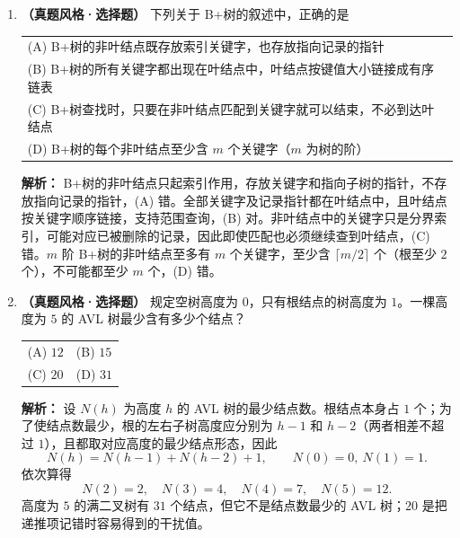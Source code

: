 \begin{enumerate}[resume]

\item \textbf{（真题风格·选择题）} 下列关于 B+树的叙述中，正确的是
\begin{center}
\begin{tabular}{l}
(A) B+树的非叶结点既存放索引关键字，也存放指向记录的指针 \\[4pt]
(B) B+树的所有关键字都出现在叶结点中，叶结点按键值大小链接成有序链表 \\[4pt]
(C) B+树查找时，只要在非叶结点匹配到关键字就可以结束，不必到达叶结点 \\[4pt]
(D) B+树的每个非叶结点至少含 $m$ 个关键字（$m$ 为树的阶）
\end{tabular}
\end{center}

\ifshowsolutions\par\noindent\textbf{解析：} B+树的非叶结点只起索引作用，存放关键字和指向子树的指针，不存放指向记录的指针，(A) 错。全部关键字及记录指针都在叶结点中，且叶结点按关键字顺序链接，支持范围查询，(B) 对。非叶结点中的关键字只是分界索引，可能对应已被删除的记录，因此即使匹配也必须继续查到叶结点，(C) 错。$m$ 阶 B+树的非叶结点至多有 $m$ 个关键字，至少含 $\lceil m/2\rceil$ 个（根至少 $2$ 个），不可能都至少 $m$ 个，(D) 错。
\par\noindent{}\else \answerarea \fi

\vspace{6pt}

\item \textbf{（真题风格·选择题）} 规定空树高度为 $0$，只有根结点的树高度为 $1$。一棵高度为 $5$ 的 AVL 树最少含有多少个结点？
\begin{center}
\begin{tabular}{ll}
(A) $12$ & (B) $15$ \\[6pt]
(C) $20$ & (D) $31$
\end{tabular}
\end{center}

\ifshowsolutions\par\noindent\textbf{解析：} 设 $N(h)$ 为高度 $h$ 的 AVL 树的最少结点数。根结点本身占 $1$ 个；为了使结点数最少，根的左右子树高度应分别为 $h-1$ 和 $h-2$（两者相差不超过 $1$），且都取对应高度的最少结点形态，因此
\[
N(h)=N(h-1)+N(h-2)+1,\qquad N(0)=0,\ N(1)=1.
\]
依次算得
\[
N(2)=2,\quad N(3)=4,\quad N(4)=7,\quad N(5)=12.
\]
高度为 $5$ 的满二叉树有 $31$ 个结点，但它不是结点数最少的 AVL 树；$20$ 是把递推项记错时容易得到的干扰值。
\par\noindent{}\else \answerarea \fi


\end{enumerate}
